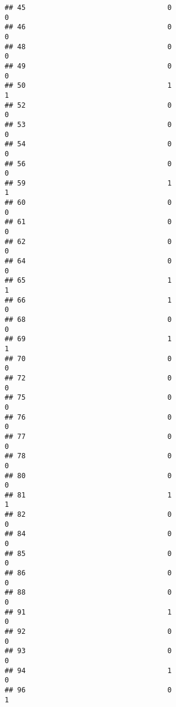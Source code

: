 \documentclass[
]{article}
\begin{document}
\begin{verbatim}
## 45                                  0                                0
## 46                                  0                                0
## 48                                  0                                0
## 49                                  0                                0
## 50                                  1                                1
## 52                                  0                                0
## 53                                  0                                0
## 54                                  0                                0
## 56                                  0                                0
## 59                                  1                                1
## 60                                  0                                0
## 61                                  0                                0
## 62                                  0                                0
## 64                                  0                                0
## 65                                  1                                1
## 66                                  1                                0
## 68                                  0                                0
## 69                                  1                                1
## 70                                  0                                0
## 72                                  0                                0
## 75                                  0                                0
## 76                                  0                                0
## 77                                  0                                0
## 78                                  0                                0
## 80                                  0                                0
## 81                                  1                                1
## 82                                  0                                0
## 84                                  0                                0
## 85                                  0                                0
## 86                                  0                                0
## 88                                  0                                0
## 91                                  1                                0
## 92                                  0                                0
## 93                                  0                                0
## 94                                  1                                0
## 96                                  0                                1

\end{verbatim}
\end{document}
